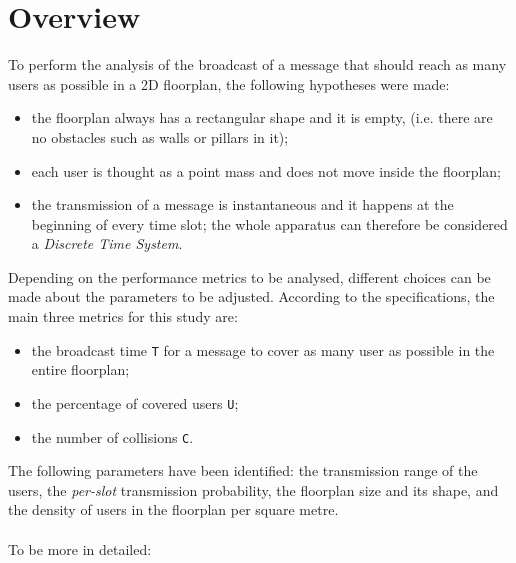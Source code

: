 %
\chapter{Overview}\label{overview}
To perform the analysis of the broadcast of a message that should reach as many
users as possible in a 2D floorplan, the following hypotheses were made:
\begin{itemize}
	\item the floorplan always has a rectangular shape and it is empty, (i.e.
	there are no obstacles such as walls or pillars in it);
	\item each user is thought as a point mass and does not move inside the
	floorplan;
	\item the transmission of a message is instantaneous and it happens at the
	beginning of every time slot; the whole apparatus can therefore be
	considered a \textit{Discrete Time System}.
\end{itemize}
Depending on the performance metrics to be analysed, different choices can be
made about the parameters to be adjusted. According to the specifications, the
main three metrics for this study are:
\begin{itemize}
	\item the broadcast time \colorbox{gray!30}{\large \texttt{T}} for a message
	to cover as many user as possible in the entire floorplan;
	\item the percentage of covered users \colorbox{gray!30}{\large \texttt{U}};
	\item the number of collisions \colorbox{gray!30}{\large \texttt{C}}.
\end{itemize}
The following parameters have been identified: the transmission range of the
users, the \textit{per-slot} transmission probability, the floorplan size and
its shape, and the density of users in the floorplan per square metre.\\
\\
To be more in detailed:
